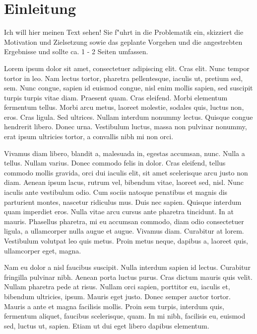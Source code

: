 \newpage
\chapter{Einleitung}
Ich will hier meinen Text sehen!
Sie f"uhrt in die Problematik ein, skizziert die Motivation und
Zielsetzung sowie das geplante Vorgehen und die angestrebten
Ergebnisse und sollte ca. 1 - 2 Seiten umfassen.

Lorem ipsum dolor sit amet, consectetuer adipiscing elit. Cras elit. Nunc tempor tortor in leo. Nam lectus tortor, pharetra pellentesque, iaculis ut, pretium sed, sem. Nunc congue, sapien id euismod congue, nisl enim mollis sapien, sed suscipit turpis turpis vitae diam. Praesent quam. Cras eleifend. Morbi elementum fermentum tellus. Morbi arcu metus, laoreet molestie, sodales quis, luctus non, eros. Cras ligula. Sed ultrices. Nullam interdum nonummy lectus. Quisque congue hendrerit libero. Donec urna. Vestibulum luctus, massa non pulvinar nonummy, erat ipsum ultricies tortor, a convallis nibh mi non orci. 

Vivamus diam libero, blandit a, malesuada in, egestas accumsan, nunc. Nulla a tellus. Nullam varius. Donec commodo felis in dolor. Cras eleifend, tellus commodo mollis gravida, orci dui iaculis elit, sit amet scelerisque arcu justo non diam. Aenean ipsum lacus, rutrum vel, bibendum vitae, laoreet sed, nisl. Nunc iaculis ante vestibulum odio. Cum sociis natoque penatibus et magnis dis parturient montes, nascetur ridiculus mus. Duis nec sapien. Quisque interdum quam imperdiet eros. Nulla vitae arcu cursus ante pharetra tincidunt. In at mauris. Phasellus pharetra, mi eu accumsan commodo, diam odio consectetuer ligula, a ullamcorper nulla augue et augue. Vivamus diam. Curabitur at lorem. Vestibulum volutpat leo quis metus. Proin metus neque, dapibus a, laoreet quis, ullamcorper eget, magna. 

Nam eu dolor a nisl faucibus suscipit. Nulla interdum sapien id lectus. Curabitur fringilla pulvinar nibh. Aenean porta luctus purus. Cras dictum mauris quis velit. Nullam pharetra pede at risus. Nullam orci sapien, porttitor eu, iaculis et, bibendum ultricies, ipsum. Mauris eget justo. Donec semper auctor tortor. Mauris a ante et magna facilisis mollis. Proin sem turpis, interdum quis, fermentum aliquet, faucibus scelerisque, quam. In mi nibh, facilisis eu, euismod sed, luctus ut, sapien. Etiam ut dui eget libero dapibus elementum. 
 

